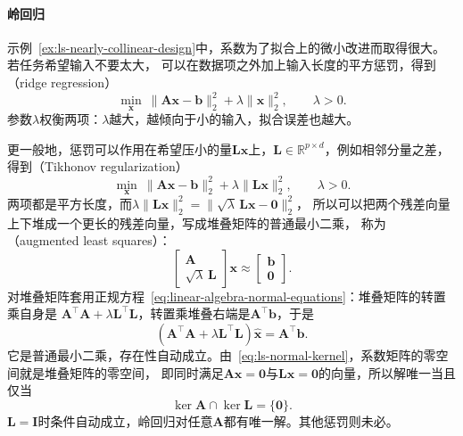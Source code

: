 \paragraph{岭回归}
\label{sec:ls-regularized-ls}

示例~\ref{ex:ls-nearly-collinear-design}中，系数为了拟合上的微小改进而取得很大。若任务希望输入不要太大，
可以在数据项之外加上输入长度的平方惩罚，得到（ridge regression）
\begin{equation}
 \min_{\bm x}\ \lVert\bm A\bm x-\bm b\rVert_2^2+\lambda\lVert\bm x\rVert_2^2,
 \qquad \lambda>0.
 \label{eq:ls-ridge-objective}
\end{equation}
参数$\lambda$权衡两项：$\lambda$越大，越倾向于小的输入，拟合误差也越大。

更一般地，惩罚可以作用在希望压小的量$\bm L\bm x$上，$\bm L\in\mathbb R^{p\times d}$，例如相邻分量之差，
得到（Tikhonov regularization）
\begin{equation}
 \min_{\bm x}\ \lVert\bm A\bm x-\bm b\rVert_2^2+\lambda\lVert\bm L\bm x\rVert_2^2,
 \qquad \lambda>0.
 \label{eq:linear-algebra-general-tikhonov}
\end{equation}
两项都是平方长度，而$\lambda\lVert\bm L\bm x\rVert_2^2=\lVert\sqrt\lambda\,\bm L\bm x-\bm0\rVert_2^2$，
所以可以把两个残差向量上下堆成一个更长的残差向量，写成堆叠矩阵的普通最小二乘，
称为（augmented least squares）：
\begin{equation}
 \begin{bmatrix}\bm A\\ \sqrt{\lambda}\,\bm L\end{bmatrix}\bm x
 \approx\begin{bmatrix}\bm b\\ \bm0\end{bmatrix}.
 \label{eq:ls-augmented-system}
\end{equation}
对堆叠矩阵套用正规方程~\eqref{eq:linear-algebra-normal-equations}：堆叠矩阵的转置乘自身是
$\bm A^\top\bm A+\lambda\bm L^\top\bm L$，转置乘堆叠右端是$\bm A^\top\bm b$，于是
\begin{equation}
 (\bm A^\top\bm A+\lambda\bm L^\top\bm L)\hat{\bm x}=\bm A^\top\bm b.
 \label{eq:ls-tikhonov-normal}
\end{equation}
它是普通最小二乘，存在性自动成立。由~\eqref{eq:ls-normal-kernel}，系数矩阵的零空间就是堆叠矩阵的零空间，
即同时满足$\bm A\bm x=\bm0$与$\bm L\bm x=\bm0$的向量，所以解唯一当且仅当
\begin{equation}
 \ker\bm A\cap\ker\bm L=\{\bm0\}.
 \label{eq:linear-algebra-tikhonov-common-nullspace}
\end{equation}
$\bm L=\bm I$时条件自动成立，岭回归对任意$\bm A$都有唯一解。其他惩罚则未必。

